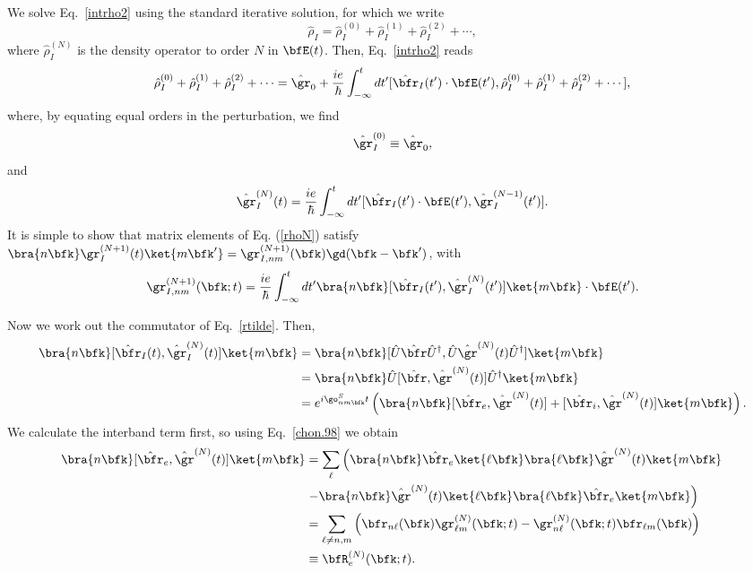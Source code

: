 \documentclass[floatfix,prb,aps,superscriptaddress,11pt,preprint,letterpaper]{revtex4}
\begin{document}
We solve Eq.~\eqref{intrho2} using the standard iterative
solution, for which we write
\begin{equation}\label{rhop}
\hat\rho_I=\hat\rho_I^{(0)}+\hat\rho_I^{(1)}+\hat\rho_I^{(2)}+\cdots
,
\end{equation}
where $\hat\rho_I^{(N)}$ is the density operator to order $N$ in $\bfE(t)$.
Then, Eq.~\eqref{intrho2} reads
\begin{equation}\label{intrho3}
\hat\rho_I^{(0)}+\hat\rho_I^{(1)}+\hat\rho_I^{(2)}+\cdots
=\hat\gr_0
+
\frac{ie}{\hbar}\int_{-\infty}^t dt'[\hat\bfr_I(t')\cdot\bfE(t'),
\hat\rho_I^{(0)}+\hat\rho_I^{(1)}+\hat\rho_I^{(2)}+\cdots
]
,
\end{equation}
where, by equating equal orders in the perturbation, we find
\begin{equation}\label{rho0}
\hat\gr_I^{(0)}\equiv\hat\gr_0
,
\end{equation}
and
\begin{equation}\label{rhoN}
\hat\gr_I^{(N)}(t)=
\frac{ie}{\hbar}
\int_{-\infty}^t dt'[\hat\bfr_I(t')\cdot\bfE(t'),\hat\gr^{(N-1)}_I(t')].
\end{equation}
It is simple to show that matrix elements of Eq. (\ref{rhoN}) satisfy
$\bra{n\bfk}\gr_I^{(N+1)}(t)\ket{m\bfk'}=\gr^{(N+1)}_{I,nm}(\bfk)\gd(\bfk-\bfk')$,
with
\begin{equation}\label{rtilde}
\gr^{(N+1)}_{I,nm}(\bfk;t)
=\frac{ie}{\hbar}\int_{-\infty}^t dt'
\bra{n\bfk}
[\hat\bfr_I(t'),\hat\gr^{(N)}_I(t')]
\ket{m\bfk}
\cdot\bfE(t')
.
\end{equation}

Now we work out the commutator of Eq.~\eqref{rtilde}. Then,
\begin{align}\label{conmu1}
\bra{n\bfk}
[\hat\bfr_I(t),\hat\gr^{(N)}_I(t)]
\ket{m\bfk}
&=
\bra{n\bfk}
[\hat{U}\hat\bfr\hat{U}^\dagger,\hat{U}\hat\gr^{(N)}(t)\hat{U}^\dagger]
\ket{m\bfk}
\nonumber \\
&=
\bra{n\bfk}
\hat{U}[\hat\bfr,\hat\gr^{(N)}(t)]\hat{U}^\dagger
\ket{m\bfk}
\\
&=
e^{i\go^S_{nm\bfk}t}
\left(
\bra{n\bfk}
[\hat\bfr_e,\hat\gr^{(N)}(t)]
+
[\hat\bfr_i,\hat\gr^{(N)}(t)]
\ket{m\bfk}
\right)
\nonumber
.
\end{align}
We calculate the interband term first, so using Eq.~\eqref{chon.98} we obtain
\begin{align}\label{conmu2}
\bra{n\bfk}
[\hat\bfr_e,\hat\gr^{(N)}(t)]
\ket{m\bfk}
&=
\sum_{\ell}
\left(
\bra{n\bfk}
\hat\bfr_e
\ket{\ell\bfk}
\bra{\ell\bfk}
\hat\gr^{(N)}(t)
\ket{m\bfk}
\right.
\nonumber \\
&
\left.
-
\bra{n\bfk}
\hat\gr^{(N)}(t)
\ket{\ell\bfk}
\bra{\ell\bfk}
\hat\bfr_e
\ket{m\bfk}
\right)
\nonumber \\
&=
\sum_{\ell\ne n,m}
\left(
\bfr_{n\ell}(\bfk)
\gr^{(N)}_{\ell m}(\bfk;t)
-
\gr^{(N)}_{n\ell}(\bfk;t)
\bfr_{\ell m}(\bfk)
\right)
\nonumber\\
&\equiv
\bfR^{(N)}_e(\bfk;t)
.
\end{align}
\end{document}
